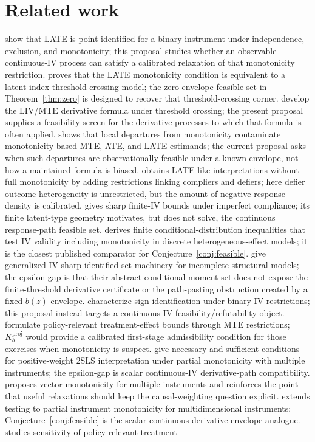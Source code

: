\documentclass[11pt]{article}
\theoremstyle{definition}
\theoremstyle{plain}
\theoremstyle{remark}
\begin{document}
\section{Related work}
\citet{ImbensAngrist1994} show that LATE is point identified for a binary instrument under independence, exclusion, and monotonicity; this proposal studies whether an observable continuous-IV process can satisfy a calibrated relaxation of that monotonicity restriction.  \citet{Vytlacil2002} proves that the LATE monotonicity condition is equivalent to a latent-index threshold-crossing model; the zero-envelope feasible set in Theorem~\ref{thm:zero} is designed to recover that threshold-crossing corner.  \citet{HeckmanVytlacil2005} develop the LIV/MTE derivative formula under threshold crossing; the present proposal supplies a feasibility screen for the derivative processes to which that formula is often applied.  \citet{Klein2010} shows that local departures from monotonicity contaminate monotonicity-based MTE, ATE, and LATE estimands; the current proposal asks when such departures are observationally feasible under a known envelope, not how a maintained formula is biased.  \citet{DeChaisemartin2017} obtains LATE-like interpretations without full monotonicity by adding restrictions linking compliers and defiers; here defier outcome heterogeneity is unrestricted, but the amount of negative response density is calibrated.  \citet{BalkePearl1997} gives sharp finite-IV bounds under imperfect compliance; its finite latent-type geometry motivates, but does not solve, the continuous response-path feasible set.  \citet{Kitagawa2015} derives finite conditional-distribution inequalities that test IV validity including monotonicity in discrete heterogeneous-effect models; it is the closest published comparator for Conjecture~\ref{conj:feasible}.  \citet{ChesherRosen2017} give generalized-IV sharp identified-set machinery for incomplete structural models; the epsilon-gap is that their abstract conditional-moment set does not expose the finite-threshold derivative certificate or the path-pasting obstruction created by a fixed \(b(z)\) envelope.  \citet{MachadoShaikhVytlacil2019} characterize sign identification under binary-IV restrictions; this proposal instead targets a continuous-IV feasibility/refutability object.  \citet{MogstadSantosTorgovitsky2018} formulate policy-relevant treatment-effect bounds through MTE restrictions; \(K_b^{\mathrm{proj}}\) would provide a calibrated first-stage admissibility condition for those exercises when monotonicity is suspect.  \citet{MogstadTorgovitskyWalters2021} give necessary and sufficient conditions for positive-weight 2SLS interpretation under partial monotonicity with multiple instruments; the epsilon-gap is scalar continuous-IV derivative-path compatibility.  \citet{Mountjoy2024} proposes vector monotonicity for multiple instruments and reinforces the point that useful relaxations should keep the causal-weighting question explicit.  \citet{JiangSun2023PartialMonotonicityTest} extends testing to partial instrument monotonicity for multidimensional instruments; Conjecture~\ref{conj:feasible} is the scalar continuous derivative-envelope analogue.  \citet{Yap2022} studies sensitivity of policy-relevant treatment 
\end{document}
